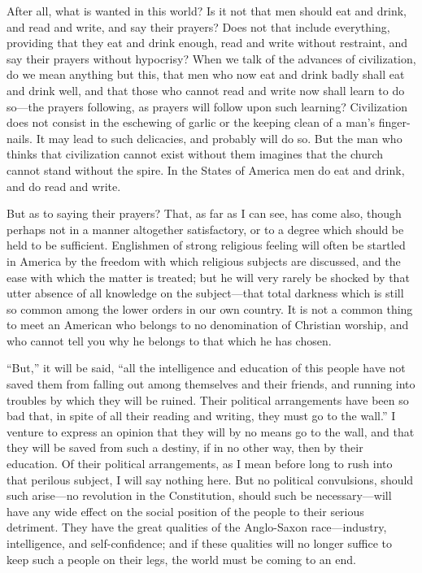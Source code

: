 After all, what is wanted in this world?  Is it not that men should
eat and drink, and read and write, and say their prayers?  Does not
that include everything, providing that they eat and drink enough,
read and write without restraint, and say their prayers without
hypocrisy?  When we talk of the advances of civilization, do we
mean anything but this, that men who now eat and drink badly shall
eat and drink well, and that those who cannot read and write now
shall learn to do so---the prayers following, as prayers will follow
upon such learning?  Civilization does not consist in the eschewing
of garlic or the keeping clean of a man's finger-nails.  It may
lead to such delicacies, and probably will do so.  But the man who
thinks that civilization cannot exist without them imagines that
the church cannot stand without the spire.  In the States of
America men do eat and drink, and do read and write.

But as to saying their prayers?  That, as far as I can see, has
come also, though perhaps not in a manner altogether satisfactory,
or to a degree which should be held to be sufficient.  Englishmen
of strong religious feeling will often be startled in America by
the freedom with which religious subjects are discussed, and the
ease with which the matter is treated; but he will very rarely be
shocked by that utter absence of all knowledge on the subject---that
total darkness which is still so common among the lower orders in
our own country.  It is not a common thing to meet an American who
belongs to no denomination of Christian worship, and who cannot
tell you why he belongs to that which he has chosen.

``But,'' it will be said, ``all the intelligence and education of this
people have not saved them from falling out among themselves and
their friends, and running into troubles by which they will be
ruined.  Their political arrangements have been so bad that, in
spite of all their reading and writing, they must go to the wall.''
I venture to express an opinion that they will by no means go to
the wall, and that they will be saved from such a destiny, if in no
other way, then by their education.  Of their political
arrangements, as I mean before long to rush into that perilous
subject, I will say nothing here.  But no political convulsions,
should such arise---no revolution in the Constitution, should such
be necessary---will have any wide effect on the social position of
the people to their serious detriment.  They have the great
qualities of the Anglo-Saxon race---industry, intelligence, and
self-confidence; and if these qualities will no longer suffice to
keep such a people on their legs, the world must be coming to an
end.

